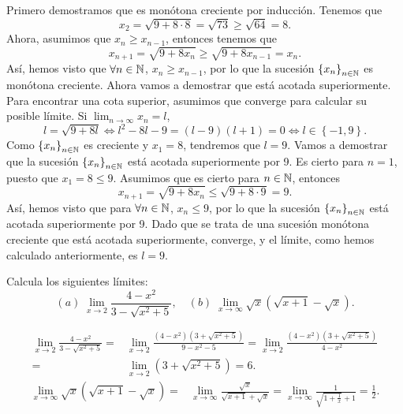 \documentclass{article}
\begin{document}
\begin{sol}
Primero demostramos que es monótona creciente por inducción. Tenemos que 
\[x_{2} = \sqrt{9 + 8 \cdot 8} = \sqrt{73} \geq \sqrt{64} = 8 .\]
Ahora, asumimos que $\displaystyle x_{n} \geq x_{n-1} $, entonces tenemos que
\[x_{n+1} = \sqrt{9 + 8 x_{n}} \geq \sqrt{9 + 8x_{n-1}} = x_{n} .\]
Así, hemos visto que $\displaystyle \forall n \in \mathbb{N} $, $\displaystyle x_{n} \geq x_{n-1} $, por lo que la sucesión $\displaystyle \left\{ x_{n}\right\} _{n\in\mathbb{N}} $ es monótona creciente. Ahora vamos a demostrar que está acotada superiormente. Para encontrar una cota superior, asumimos que converge para calcular su posible límite. Si $\displaystyle \lim_{n \to \infty}x_{n} = l $,
\[ l = \sqrt{9 + 8l} \iff l^{2} - 8l - 9 = \left(l-9\right)\left(l + 1\right) = 0 \iff l \in \left\{ -1,9\right\} .\]
Como $\displaystyle \left\{ x_{n}\right\} _{n\in\mathbb{N}} $ es creciente y $\displaystyle x_{1} = 8 $, tendremos que $\displaystyle l = 9 $. Vamos a demostrar que la sucesión $\displaystyle \left\{ x_{n}\right\} _{n\in\mathbb{N}} $ está acotada superiormente por 9. Es cierto para $\displaystyle n = 1 $, puesto que $\displaystyle x_{1} = 8 \leq 9 $. Asumimos que es cierto para $\displaystyle n \in \mathbb{N} $, entonces
\[x_{n+1} = \sqrt{9 + 8x_{n}} \leq \sqrt{9 + 8 \cdot 9} = 9 .\]
Así, hemos visto que para $\displaystyle \forall n \in \mathbb{N} $, $\displaystyle x_{n} \leq 9 $, por lo que la sucesión $\displaystyle \left\{ x_{n}\right\} _{n\in\mathbb{N}} $ está acotada superiormente por 9. Dado que se trata de una sucesión monótona creciente que está acotada superiormente, converge, y el límite, como hemos calculado anteriormente, es $\displaystyle l = 9 $.
\end{sol}
\begin{ej}
Calcula los siguientes límites:
\[\left(a\right) \; \lim_{x \to 2}\frac{4 - x^{2}}{3-\sqrt{x^{2}+5}}, \quad \left(b\right)\; \lim_{x \to \infty}\sqrt{x}\left(\sqrt{x+1}-\sqrt{x}\right) .\]
\end{ej}
\begin{sol}
\[
\begin{split}
	\lim_{x \to 2}\frac{4 - x^{2}}{3-\sqrt{x^{2}+5}} = & \lim_{x \to 2}\frac{\left(4-x^{2}\right)\left(3 +\sqrt{x^{2}+5}\right)}{9 - x^{2}-5} = \lim_{x \to 2}\frac{\left(4-x^{2}\right)\left(3+\sqrt{x^{2}+5}\right)}{4-x^{2}} \\
	= & \lim_{x \to 2}\left(3+\sqrt{x^{2}+5}\right) = 6.
\end{split}
\]
\[
\begin{split}
	\lim_{x \to \infty}\sqrt{x}\left(\sqrt{x+1}-\sqrt{x}\right) = & \lim_{x \to \infty}\frac{\sqrt{x}}{\sqrt{x+1}+\sqrt{x}} = \lim_{x \to \infty}\frac{1}{\sqrt{1 + \frac{1}{x}}+1} = \frac{1}{2} .
\end{split}
\]
\end{sol}
\end{document}
